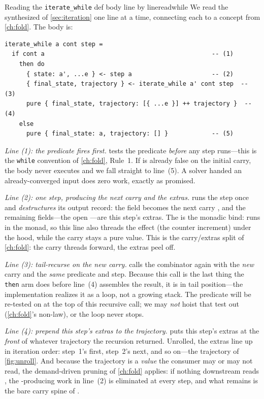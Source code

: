 \begin{workedexample}{Reading the \texttt{iterate\_while} def body line by line}{readwhile}
We read the synthesized  of \cref{sec:iteration} one line at a
time, connecting each to a concept from \cref{ch:fold}. The body is:
\begin{lstlisting}[style=l4style]
iterate_while a cont step =
  if cont a                                              -- (1)
    then do
      { state: a', ...e } <- step a                      -- (2)
      { final_state, trajectory } <- iterate_while a' cont step  -- (3)
      pure { final_state, trajectory: [{ ...e }] ++ trajectory }  -- (4)
    else
      pure { final_state: a, trajectory: [] }            -- (5)
\end{lstlisting}

\emph{Line (1): the predicate fires first.}  tests the predicate
\emph{before} any step runs---this is the \texttt{while} convention of
\cref{ch:fold}, Rule~1. If  is already false on the initial carry, the
body never executes and we fall straight to line~(5). A solver handed an
already-converged input does zero work, exactly as promised.

\emph{Line (2): one step, producing the next carry and the extras.}
 runs the step once and \emph{destructures}
its output record: the  field becomes the next carry , and the
remaining fields---the open ---are this step's extras. The \code{<-} is
the monadic bind:  runs in the  monad, so this line also
threads the  effect (the counter increment) under the hood, while
the carry  stays a pure value. This is the carry/extras split of
\cref{ch:fold}: the carry threads forward, the extras peel off.

\emph{Line (3): tail-recurse on the new carry.}
 calls the combinator again with the
\emph{new} carry  and the \emph{same} predicate and step. Because this call
is the last thing the \texttt{then} arm does before line~(4) assembles the result,
it is in tail position---the implementation realizes it as a loop, not a growing
stack. The predicate will be re-tested on  at the top of this recursive
call; we may \emph{not} hoist that test out (\cref{ch:fold}'s non-law), or the loop
never stops.

\emph{Line (4): prepend this step's extras to the trajectory.}
 puts this step's extras at the \emph{front} of
whatever trajectory the recursion returned. Unrolled, the extras line up in
iteration order: step~1's first, step~2's next, and so on---the trajectory of
\cref{fig:unroll}. And because the trajectory is a \emph{value} the consumer may or
may not read, the demand-driven pruning of \cref{ch:fold} applies: if nothing
downstream reads , the -producing work in line~(2) is
eliminated at every step, and what remains is the bare carry spine of
.


\end{workedexample}
